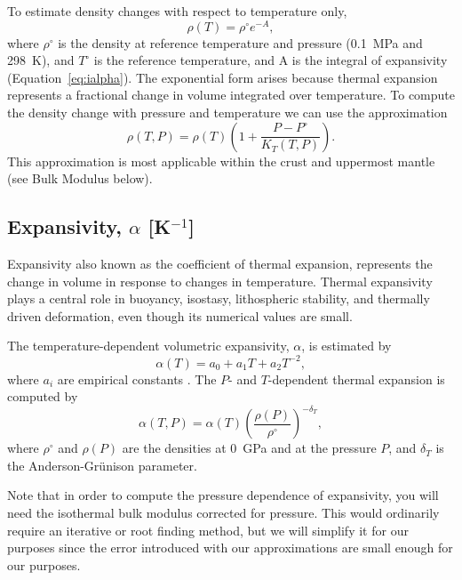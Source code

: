 To estimate density changes with respect to temperature only,
\begin{equation}
    \rho(T) = \rho^{\circ} e^{-A},
\end{equation}
where $\rho^{\circ}$ is the density at reference temperature and pressure
(0.1~MPa and 298~K), and $T^\circ$ is the reference temperature, and A is the
integral of expansivity (Equation~\ref{eq:ialpha}).  The exponential form arises
because thermal expansion represents a fractional change in volume integrated over
temperature.  To compute the density change with pressure and temperature we can
use the approximation
\begin{equation}
    \rho(T,P) = \rho(T) \left( 1 + \frac{P - P^\circ}{K_T(T,P)} \right) .
\end{equation}
This approximation is most applicable within the crust and uppermost mantle (see
Bulk Modulus below).


\subsection{Expansivity, $\alpha$ [K$^{-1}$]} \label{sec:expansivity}

Expansivity also known as the coefficient of thermal expansion, represents the
change in volume in response to changes in temperature.  Thermal expansivity plays
a central role in buoyancy, isostasy, lithospheric stability, and thermally driven
deformation, even though its numerical values are small.

The temperature-dependent volumetric expansivity, $\alpha$,
is estimated by
\begin{equation}
    \alpha(T) = a_{0} + a_{1}T + a_{2}T^{-2},
\end{equation}
where $a_{i}$ are empirical constants \citep{Fei1995}. The $P$- and
$T$-dependent thermal expansion is computed by
\begin{equation}
    \alpha(T,P) =
    \alpha(T)\left( \frac{\rho(P)}{\rho^\circ} \right)^{-\delta_{T}},
\end{equation}
where $\rho^\circ$ and $\rho(P)$ are the densities at $0$~GPa and at the
pressure $P$, and $\delta_{T}$ is the Anderson-Gr{\"u}nison parameter.

Note that in order to compute the pressure dependence of expansivity, you will
need the isothermal bulk modulus corrected for pressure.  This would ordinarily
require an iterative or root finding method, but we will simplify it for our
purposes since the error introduced with our approximations are small enough for
our purposes.

